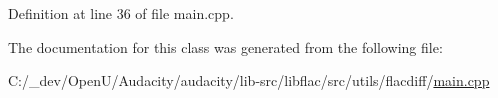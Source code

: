 Definition at line 36 of file main.\+cpp.



The documentation for this class was generated from the following file\+:\begin{DoxyCompactItemize}
\item 
C\+:/\+\_\+dev/\+Open\+U/\+Audacity/audacity/lib-\/src/libflac/src/utils/flacdiff/\hyperlink{lib-src_2libflac_2src_2utils_2flacdiff_2main_8cpp}{main.\+cpp}\end{DoxyCompactItemize}
